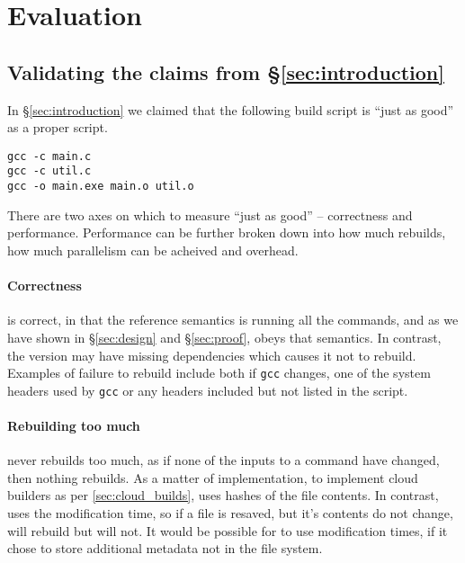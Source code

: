 \section{Evaluation}
\label{sec:evaluation}

\subsection{Validating the claims from \S\ref{sec:introduction}}

In \S\ref{sec:introduction} we claimed that the following build script is ``just as good'' as a proper \Make script.

\begin{verbatim}
gcc -c main.c
gcc -c util.c
gcc -o main.exe main.o util.o
\end{verbatim}

There are two axes on which to measure ``just as good'' -- correctness and performance. Performance can be further broken down into how much rebuilds, how much parallelism can be acheived and overhead.

\paragraph{Correctness} \Rattle is correct, in that the reference semantics is running all the commands, and as we have shown in \S\ref{sec:design} and \S\ref{sec:proof}, \Rattle obeys that semantics. In contrast, the \Make version may have missing dependencies which causes it not to rebuild. Examples of failure to rebuild include both if \texttt{gcc} changes, one of the system headers used by \texttt{gcc} or any headers included but not listed in the \Make script.

\paragraph{Rebuilding too much} \Rattle never rebuilds too much, as if none of the inputs to a command have changed, then nothing rebuilds. As a matter of implementation, to implement cloud builders as per \ref{sec:cloud_builds}, \Rattle uses hashes of the file contents. In contrast, \Make uses the modification time, so if a file is resaved, but it's contents do not change, \Make will rebuild but \Rattle will not. It would be possible for \Make to use modification times, if it chose to store additional metadata not in the file system.


